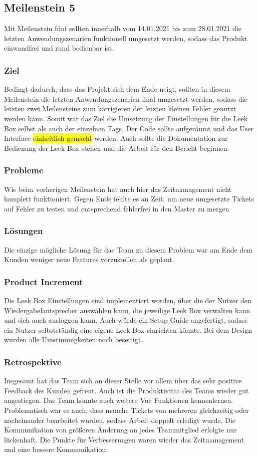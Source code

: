 \documentclass[10pt, a4paper, draft]{article}
\begin{document}
\subsection{Meilenstein 5}
Mit Meilenstein fünf sollten innerhalb vom 14.01.2021 bis zum 28.01.2021 die letzten Anwendungszenarien funktionell umgesetzt werden, sodass das Produkt einwandfrei und rund bedienbar ist.
\subsubsection{Ziel}
Bedingt dadurch, dass das Projekt sich dem Ende neigt, sollten in diesem Meilenstein die letzten Anwendungszenarien final umgesetzt werden, sodass die letzten zwei Meilensteine zum korrigieren der letzten kleinen Fehler genutzt werden kann.
Somit war das Ziel die Umsetzung der Einstellungen für die Leek Box selbst als auch der einzelnen Tags.
Der Code sollte aufgeräumt und das User Interface \colorbox{yellow}{einheitlich gemacht} werden.
Auch sollte die Dokumentation zur Bedienung der Leek Box stehen und die Arbeit für den Bericht beginnen.
\subsubsection{Probleme}
Wie beim vorherigen Meilenstein hat auch hier das Zeitmanagement nicht komplett funktioniert.
Gegen Ende fehlte es an Zeit, um neue umgesetzte Tickets auf Fehler zu testen und entsprechend fehlerfrei in den Master zu mergen
\subsubsection{Lösungen}
Die einzige mögliche Lösung für das Team zu diesem Problem war am Ende dem Kunden weniger neue Features vorzustellen als geplant.
\subsubsection{Product Increment}
Die Leek Box Einstellungen sind implementiert worden, über die der Nutzer den Wiedergabelautsprecher auswählen kann, die jeweilige Leek Box verwalten kann und sich auch ausloggen kann.
Auch würde ein Setup Guide angefertigt, sodass ein Nutzer selbstständig eine eigene Leek Box einrichten könnte.
Bei dem Design wurden alle Umstimmigkeiten noch beseitigt.
\subsubsection{Retrospektive}
Insgesamt hat das Team sich an dieser Stelle vor allem über das sehr positive Feedback des Kunden gefreut.
Auch ist die Produktivität des Teams wieder gut angestiegen.
Das Team konnte auch weitere Vue Funktionen kennenlernen.
Problematisch war es auch, dass manche Tickets von mehreren gleichzeitig oder nacheinander bearbeitet wurden, sodass Arbeit doppelt erledigt wurde.
Die Kommunikation von größeren Änderung an jedes Teammitglied erfolgte nur lückenhaft.
Die Punkte für Verbesserungen waren wieder das Zeitmanagement und eine bessere Kommunikation.
\end{document}
